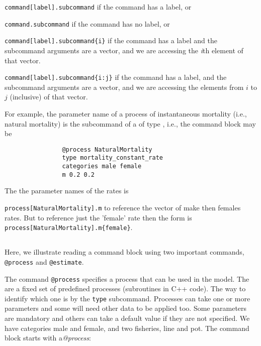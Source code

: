 \begin{description}
	\item \texttt{command[label].subcommand} if the command has a label, or
	\item \texttt{command.subcommand} if the command has no label, or
	\item \texttt{command[label].subcommand\{i\}} if the command has a label and the subcommand arguments are a vector, and we are accessing the  \emph{i}th element of that vector.
	\item \texttt{command[label].subcommand\{i:j\}} if the command has a label, and the subcommand arguments are a vector, and we are accessing the elements from $i$ to $j$ (inclusive) of that vector.
\end{description}

For example, the parameter name of a process of instantaneous mortality (i.e., natural mortality) is the subcommand  of a  of type , i.e., the command block may be

\small{\begin{verbatim}
				@process NaturalMortality
				type mortality_constant_rate
				categories male female
				m 0.2 0.2
\end{verbatim}}

The the parameter names of the rates is

\texttt{process[NaturalMortality].m} to reference the vector of make then females rates. But to reference just the 'female' rate then the form is
\texttt{process[NaturalMortality].m\{female\}}.

\subsection{\label{sec:Readingcommandblock}}

Here, we illustrate reading a command block using two important commands, \texttt{@process} and \texttt{@estimate}.

The command \texttt{@process} specifies a process that can be used in the model. The are a fixed set of predefined processes (subroutines in C++ code). The way to identify which one is by the \texttt{type} subcommand. Processes can take one or more parameters and some will need other data to be applied too. Some parameters are mandatory and others can take a default value if they are not specified.
We have categories male and female, and two fisheries, line and pot. The command block starts with a\textit{@process}:


